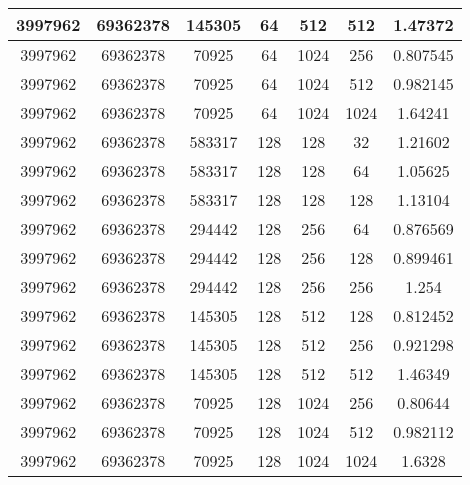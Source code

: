 \documentclass[9pt]{article}
\begin{document}
\begin{tabular}{|c|c|c|c|c|c|c| }
\hline
3997962  & 69362378  & 145305  & 64  & 512  & 512  & 1.47372 \\
\hline
3997962  & 69362378  & 70925  & 64  & 1024  & 256  & 0.807545 \\
\hline
3997962  & 69362378  & 70925  & 64  & 1024  & 512  & 0.982145 \\
\hline
3997962  & 69362378  & 70925  & 64  & 1024  & 1024  & 1.64241 \\
\hline
3997962  & 69362378  & 583317  & 128  & 128  & 32  & 1.21602 \\
\hline
3997962  & 69362378  & 583317  & 128  & 128  & 64  & 1.05625 \\
\hline
3997962  & 69362378  & 583317  & 128  & 128  & 128  & 1.13104 \\
\hline
3997962  & 69362378  & 294442  & 128  & 256  & 64  & 0.876569 \\
\hline
3997962  & 69362378  & 294442  & 128  & 256  & 128  & 0.899461 \\
\hline
3997962  & 69362378  & 294442  & 128  & 256  & 256  & 1.254 \\
\hline
3997962  & 69362378  & 145305  & 128  & 512  & 128  & 0.812452 \\
\hline
3997962  & 69362378  & 145305  & 128  & 512  & 256  & 0.921298 \\
\hline
3997962  & 69362378  & 145305  & 128  & 512  & 512  & 1.46349 \\
\hline
3997962  & 69362378  & 70925  & 128  & 1024  & 256  & 0.80644 \\
\hline
3997962  & 69362378  & 70925  & 128  & 1024  & 512  & 0.982112 \\
\hline
3997962  & 69362378  & 70925  & 128  & 1024  & 1024  & 1.6328 \\
\hline
\end{tabular}
 
\end{document}

